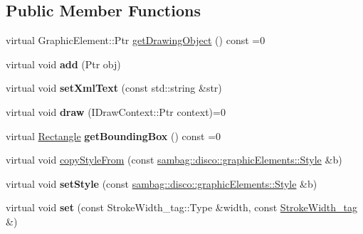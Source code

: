 \subsection*{Public Member Functions}
\begin{DoxyCompactItemize}
\item 
virtual GraphicElement::Ptr \hyperlink{classsambag_1_1disco_1_1svg_1_1_svg_object_a93bac29f2db22d713aa49678eb168183}{getDrawingObject} () const =0
\item 
\hypertarget{classsambag_1_1disco_1_1svg_1_1_svg_object_ab413d4e961c20fb164ef10cfa01cfb53}{
virtual void {\bfseries add} (Ptr obj)}
\label{classsambag_1_1disco_1_1svg_1_1_svg_object_ab413d4e961c20fb164ef10cfa01cfb53}

\item 
\hypertarget{classsambag_1_1disco_1_1svg_1_1_svg_object_a17dfe153c81cd09b1e08b33d44cc4ef2}{
virtual void {\bfseries setXmlText} (const std::string \&str)}
\label{classsambag_1_1disco_1_1svg_1_1_svg_object_a17dfe153c81cd09b1e08b33d44cc4ef2}

\item 
\hypertarget{classsambag_1_1disco_1_1svg_1_1_svg_object_a42e6ae33457f1e7eaa9a5c31ae197e42}{
virtual void {\bfseries draw} (IDrawContext::Ptr context)=0}
\label{classsambag_1_1disco_1_1svg_1_1_svg_object_a42e6ae33457f1e7eaa9a5c31ae197e42}

\item 
\hypertarget{classsambag_1_1disco_1_1svg_1_1_svg_object_aa1dbea0f2f716828a19a18b0ef18b77b}{
virtual \hyperlink{classsambag_1_1com_1_1_rectangle}{Rectangle} {\bfseries getBoundingBox} () const =0}
\label{classsambag_1_1disco_1_1svg_1_1_svg_object_aa1dbea0f2f716828a19a18b0ef18b77b}

\item 
virtual void \hyperlink{classsambag_1_1disco_1_1svg_1_1_svg_object_adbe97b7b7d0bb9e41add7304f090ac91}{copyStyleFrom} (const \hyperlink{classsambag_1_1disco_1_1graphic_elements_1_1_style}{sambag::disco::graphicElements::Style} \&b)
\item 
\hypertarget{classsambag_1_1disco_1_1svg_1_1_svg_object_a6ff59420e02b5f80730be964767aaf30}{
virtual void {\bfseries setStyle} (const \hyperlink{classsambag_1_1disco_1_1graphic_elements_1_1_style}{sambag::disco::graphicElements::Style} \&b)}
\label{classsambag_1_1disco_1_1svg_1_1_svg_object_a6ff59420e02b5f80730be964767aaf30}

\item 
\hypertarget{classsambag_1_1disco_1_1svg_1_1_svg_object_abee1cd5d8cfcb9d7846aad0b5fca7384}{
virtual void {\bfseries set} (const StrokeWidth\_\-tag::Type \&width, const \hyperlink{structsambag_1_1disco_1_1svg_1_1_svg_object_1_1_stroke_width__tag}{StrokeWidth\_\-tag} \&)}
\label{classsambag_1_1disco_1_1svg_1_1_svg_object_abee1cd5d8cfcb9d7846aad0b5fca7384}


\end{DoxyCompactItemize}
